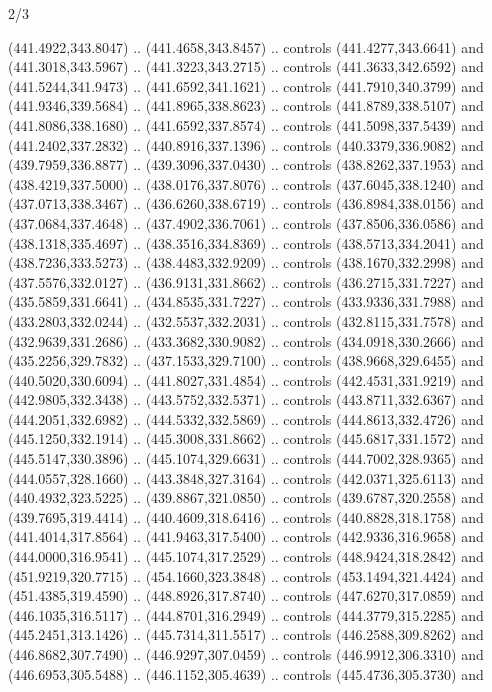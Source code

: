 \begin{flagdescription}{2/3}
\begin{scope}[xshift=0.5\flaglength,yshift=0.5\flagwidth,scale=\flagwidth/495.65]
\begin{scope}[y=0.8pt, x=0.8pt, yscale=-1,shift={(-463.76,-309.78)}]
  (441.4922,343.8047) .. (441.4658,343.8457) .. controls (441.4277,343.6641) and
  (441.3018,343.5967) .. (441.3223,343.2715) .. controls (441.3633,342.6592) and
  (441.5244,341.9473) .. (441.6592,341.1621) .. controls (441.7910,340.3799) and
  (441.9346,339.5684) .. (441.8965,338.8623) .. controls (441.8789,338.5107) and
  (441.8086,338.1680) .. (441.6592,337.8574) .. controls (441.5098,337.5439) and
  (441.2402,337.2832) .. (440.8916,337.1396) .. controls (440.3379,336.9082) and
  (439.7959,336.8877) .. (439.3096,337.0430) .. controls (438.8262,337.1953) and
  (438.4219,337.5000) .. (438.0176,337.8076) .. controls (437.6045,338.1240) and
  (437.0713,338.3467) .. (436.6260,338.6719) .. controls (436.8984,338.0156) and
  (437.0684,337.4648) .. (437.4902,336.7061) .. controls (437.8506,336.0586) and
  (438.1318,335.4697) .. (438.3516,334.8369) .. controls (438.5713,334.2041) and
  (438.7236,333.5273) .. (438.4483,332.9209) .. controls (438.1670,332.2998) and
  (437.5576,332.0127) .. (436.9131,331.8662) .. controls (436.2715,331.7227) and
  (435.5859,331.6641) .. (434.8535,331.7227) .. controls (433.9336,331.7988) and
  (433.2803,332.0244) .. (432.5537,332.2031) .. controls (432.8115,331.7578) and
  (432.9639,331.2686) .. (433.3682,330.9082) .. controls (434.0918,330.2666) and
  (435.2256,329.7832) .. (437.1533,329.7100) .. controls (438.9668,329.6455) and
  (440.5020,330.6094) .. (441.8027,331.4854) .. controls (442.4531,331.9219) and
  (442.9805,332.3438) .. (443.5752,332.5371) .. controls (443.8711,332.6367) and
  (444.2051,332.6982) .. (444.5332,332.5869) .. controls (444.8613,332.4726) and
  (445.1250,332.1914) .. (445.3008,331.8662) .. controls (445.6817,331.1572) and
  (445.5147,330.3896) .. (445.1074,329.6631) .. controls (444.7002,328.9365) and
  (444.0557,328.1660) .. (443.3848,327.3164) .. controls (442.0371,325.6113) and
  (440.4932,323.5225) .. (439.8867,321.0850) .. controls (439.6787,320.2558) and
  (439.7695,319.4414) .. (440.4609,318.6416) .. controls (440.8828,318.1758) and
  (441.4014,317.8564) .. (441.9463,317.5400) .. controls (442.9336,316.9658) and
  (444.0000,316.9541) .. (445.1074,317.2529) .. controls (448.9424,318.2842) and
  (451.9219,320.7715) .. (454.1660,323.3848) .. controls (453.1494,321.4424) and
  (451.4385,319.4590) .. (448.8926,317.8740) .. controls (447.6270,317.0859) and
  (446.1035,316.5117) .. (444.8701,316.2949) .. controls (444.3779,315.2285) and
  (445.2451,313.1426) .. (445.7314,311.5517) .. controls (446.2588,309.8262) and
  (446.8682,307.7490) .. (446.9297,307.0459) .. controls (446.9912,306.3310) and
  (446.6953,305.5488) .. (446.1152,305.4639) .. controls (445.4736,305.3730) and

\end{scope}
\end{scope}
\end{flagdescription}
